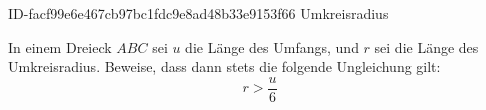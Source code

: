 \begin{exercise}
      {ID-facf99e6e467cb97bc1fdc9e8ad48b33e9153f66}
      {Umkreisradius}
  \ifproblem\problem\par
    In einem Dreieck $ABC$ sei $u$ die Länge des Umfangs, und $r$ sei die Länge des Umkreisradius.
    Beweise, dass dann stets die folgende Ungleichung gilt:
    \begin{equation*}
      r>\frac{u}{6}
    \end{equation*}
  \fi
\end{exercise}
